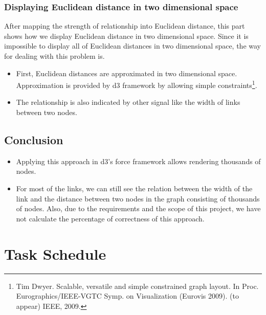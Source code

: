 \documentclass[12pt, letterpaper]{article}
\begin{document}
  \subsubsection{Displaying Euclidean distance in two dimensional space}
   After mapping the strength of relationship into Euclidean distance,
   this part shows how we display Euclidean distance in two dimensional
   space. Since it is impossible to display all of Euclidean distances
   in two dimensional space, the way for dealing with this
   problem is.
     \begin{itemize}
       \item First, Euclidean distances are approximated in two dimensional
         space.  Approximation is provided by d3 framework by allowing
         simple constraints\footnote{Tim Dwyer. Scalable, versatile and simple constrained graph layout. In Proc. Eurographics/IEEE-VGTC Symp. on Visualization (Eurovis 2009). (to appear) IEEE, 2009.}.
       \item The relationship is also indicated by other signal like
         the width of links between two nodes.
     \end{itemize}

 \subsection{Conclusion}
   \begin{itemize}
       \item Applying this approach in d3's force framework allows
         rendering thousands of nodes. 
       \item For most of the links, we can still see the relation between the width of the link
         and the distance between two nodes in the graph consisting
         of thousands of nodes. Also, due to the requirements and the
         scope of this project, we have not calculate the percentage
         of correctness of this approach.
     \end{itemize}

\section{Task Schedule}
\end{document}
